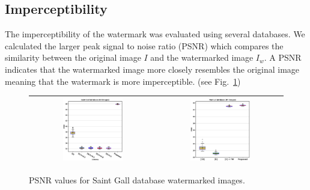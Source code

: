 \documentclass[runningheads]{llncs}
\begin{document}
\subsection{Imperceptibility}
The imperceptibility of the watermark was evaluated using several databases. We calculated the larger peak signal to noise ratio (PSNR) which compares the similarity between the original image $ I $ and the watermarked image $ I_w $. A PSNR indicates that the watermarked image more closely resembles the original image meaning that the watermark is more imperceptible. (see Fig.~\ref{psnr})
\begin{figure}[H]
	\begin{center}
		\begin{tabular}{|c|c|}\hline
			\includegraphics[width=0.5\textwidth]{PSNR_saintgall.eps}
			&\includegraphics[width=0.5\textwidth]{PSNR_parzival.eps}\\\hline
		\end{tabular}
	\end{center}
	\caption{PSNR values for Saint Gall database watermarked images.}
	\label{psnr}
\end{figure}
\end{document}
